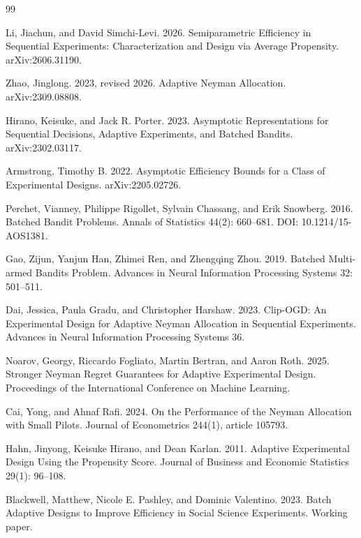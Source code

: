 \documentclass{article}
\begin{document}
\begin{thebibliography}{99}

   Li, Jiachun, and David Simchi-Levi. 2026. Semiparametric Efficiency in Sequential Experiments: Characterization and Design via Average Propensity. arXiv:2606.31190.

   Zhao, Jinglong. 2023, revised 2026. Adaptive Neyman Allocation. arXiv:2309.08808.

   Hirano, Keisuke, and Jack R. Porter. 2023. Asymptotic Representations for Sequential Decisions, Adaptive Experiments, and Batched Bandits. arXiv:2302.03117.

   Armstrong, Timothy B. 2022. Asymptotic Efficiency Bounds for a Class of Experimental Designs. arXiv:2205.02726.

   Perchet, Vianney, Philippe Rigollet, Sylvain Chassang, and Erik Snowberg. 2016. Batched Bandit Problems. Annals of Statistics 44(2): 660--681. DOI: 10.1214/15-AOS1381.

   Gao, Zijun, Yanjun Han, Zhimei Ren, and Zhengqing Zhou. 2019. Batched Multi-armed Bandits Problem. Advances in Neural Information Processing Systems 32: 501--511.

   Dai, Jessica, Paula Gradu, and Christopher Harshaw. 2023. Clip-OGD: An Experimental Design for Adaptive Neyman Allocation in Sequential Experiments. Advances in Neural Information Processing Systems 36.

   Noarov, Georgy, Riccardo Fogliato, Martin Bertran, and Aaron Roth. 2025. Stronger Neyman Regret Guarantees for Adaptive Experimental Design. Proceedings of the International Conference on Machine Learning.

   Cai, Yong, and Ahnaf Rafi. 2024. On the Performance of the Neyman Allocation with Small Pilots. Journal of Econometrics 244(1), article 105793.

   Hahn, Jinyong, Keisuke Hirano, and Dean Karlan. 2011. Adaptive Experimental Design Using the Propensity Score. Journal of Business and Economic Statistics 29(1): 96--108.

   Blackwell, Matthew, Nicole E. Pashley, and Dominic Valentino. 2023. Batch Adaptive Designs to Improve Efficiency in Social Science Experiments. Working paper.


\end{thebibliography}
\end{document}
